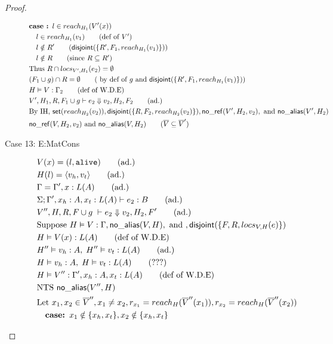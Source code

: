 \documentclass[11pt]{article}
\newcommand{\ms}[1]{\ensuremath{\mathsf{#1}}}
\newcommand{\irl}[1]{\mathtt{#1}}
\newcommand{\na}[1]{\mathsf{no\_alias}(#1)}
\newcommand{\nr}[1]{\mathsf{no\_ref}(#1)}
\newcommand{\dist}[1]{\mathsf{disjoint}(#1)}
\begin{document}
\begin{proof}
\begin{description}
\begin{align*}
  &\textbf{case : } l \in reach_{H_1}(V'(x))\\
  &\quad l \in reach_{H_1}(v_1) \tag{def of $V'$}\\
  &\quad l \notin R' \tag{$\dist{\{R',F_1,reach_{H_1}(v_1)\}}$}\\
  &\quad l \notin R \tag{since  $R \subseteq R'$}\\
  &\text{Thus }  R \cap locs_{V',H_1}(e_2) = \emptyset\\
  &(F_1 \cup  g) \cap R = \emptyset \tag{ by def of  $g$ and  $\dist{\{R',F_1,reach_{H_1}(v_1)\}}$}\\
  &H \vDash V : \Gamma_2 \tag{def of W.D.E}\\
  &V',H_1,R, F_1 \cup g \vdash e_2 \Downarrow v_2,H_2,F_2 \tag{ad.}\\
  &\text{By IH, } \ms{set}(reach_{H_2}(v_2)), \dist{\{R,F_2,reach_{H_2}(v_2)\}}, \nr{V',H_2,v_2},\text{ and } \na{V',H_2}\\
  &\nr{V,H_2,v_2} \text{ and } \na{V,H_2} \tag{$\overline V \subseteq \overline V'$}\\
  \end{align*}
  \item [Case 13: E:MatCons]
  \begin{align*}
  &V(x) = (l,\irl{alive}) \tag{ad.}\\
  &H(l) = \pairexcst{v_h}{v_t} \tag{ad.}\\
  &\Gamma = \Gamma', x : L(A) \tag{ad.}\\
  &\Sigma; \Gamma', x_h : A, x_t : L(A) \vdash e_2 : B \tag{ad.}\\
  &V'',H,R,F \cup g \; \vdash e_2 \Downarrow v_2, H_2, F' \tag{ad.} \\
  &\text{Suppose } H \vDash V : \Gamma, \na{V,H}, \text{ and },\dist{\{F,R,locs_{V,H}(e)\}}\\
  &H \vDash V(x) : L(A) \tag{def of W.D.E}\\
  &H''\vDash v_h : A,\; H'' \vDash v_t : L(A) \tag{ad.}\\
  &H\vDash v_h : A,\; H \vDash v_t : L(A) \tag{???}\\
  &H \vDash V'' : \Gamma', x_h : A, x_t : L(A) \tag{def of W.D.E}\\
  &\text{NTS } \na{V'',H}\\
  &\text{Let } x_1, x_2 \in \overline V'', x_1 \ne x_2, r_{x_1} = reach_H(\overline V''(x_1)), r_{x_2} = reach_H(\overline V''(x_2))\\
  &\quad \textbf{case: } x_1 \notin \{x_h,x_t\}, x_2 \notin \{x_h,x_t\}\\

\end{align*}
\end{description}
\end{proof}
\end{document}
